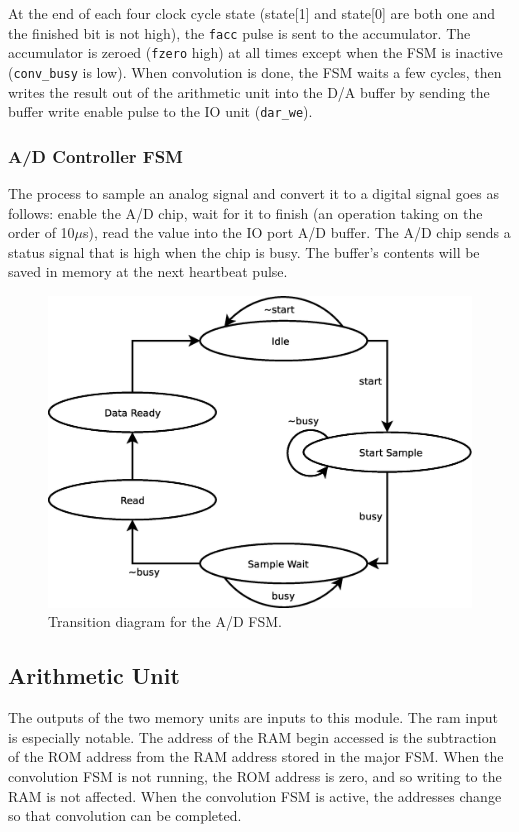 \documentclass[12pt]{article}
\begin{document}
		At the end of each four clock cycle state (state[1] and state[0] are
		both one and the finished bit is not high), the \texttt{facc} pulse is
		sent to the accumulator.  The accumulator is zeroed (\texttt{fzero}
		high) at all times except when the FSM is inactive (\texttt{conv\_busy}
		is low).  When convolution is done, the FSM waits a few cycles, then writes
		the result out of the arithmetic unit into the D/A buffer by sending
		the buffer write enable pulse to the IO unit (\texttt{dar\_we}).

		\subsubsection{A/D Controller FSM}
		The process to sample an analog signal and convert it to a digital signal
		goes as follows:  enable the A/D chip, wait for it to finish
		(an operation taking on the order of 10$\mu$s), read the value into the
		IO port A/D buffer.  The A/D chip sends a status signal that is high when
		the chip is busy.  The buffer's contents will be saved in memory at the
		next heartbeat pulse.

		\begin{figure}[ht]
		\centering
		\includegraphics[scale=0.40]{adfsm.eps}
		\caption{Transition diagram for the A/D FSM.}
		\label{fig:adfsm}
		\end{figure}



	\subsection{Arithmetic Unit}
	The outputs of the two memory units are inputs to this module.  The ram input is
	especially notable.  The address of the RAM begin accessed is the subtraction of the
	ROM address from the RAM address stored in the major FSM.  When the convolution FSM
	is not running, the ROM address is zero, and so writing to the RAM is not affected.
	When the convolution FSM is active, the addresses change so that
	convolution can be completed.
\end{document}
